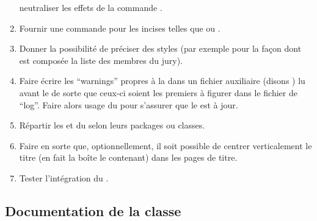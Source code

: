 \begin{enumerate}
  neutraliser les effets de la commande .
\item Fournir une commande  pour les incises telles que
   ou .
\item Donner la possibilité de préciser des styles (par exemple pour la façon
  dont est composée la liste des membres du jury).
\item Faire écrire les \foreignquote{english}{warnings} propres à la \yatcl{}
  dans un fichier auxiliaire (disons ) lu avant le  de sorte que ceux-ci
  soient les premiers à figurer dans le fichier de
  \foreignquote{english}{log}. Faire alors usage du 
  pour s'assurer que le  est à jour.
\item Répartir les  et  du
   selon leurs packages ou classes.
\item Faire en sorte que, optionnellement, il soit possible de centrer
  verticalement le titre (en fait la boîte le contenant) dans les pages de
  titre.
\item Tester l'intégration du .
\end{enumerate}

\subsection{Documentation de la classe}
\label{sec:documentation-de-la-ult}

